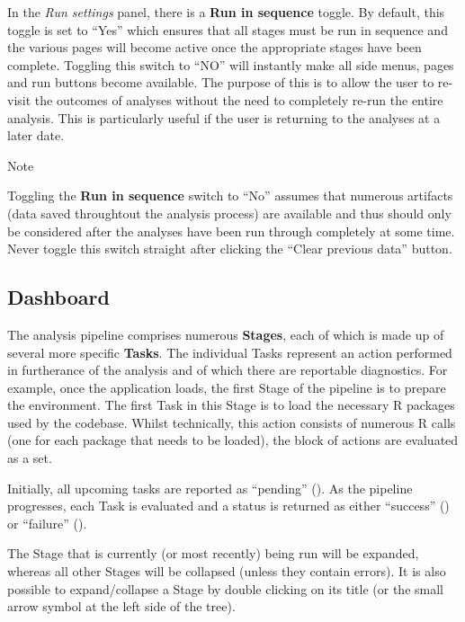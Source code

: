 \documentclass[
  8pt,
  a4paper]{article}
\begin{document}
In the \emph{Run settings} panel, there is a \textbf{Run in sequence}
toggle. By default, this toggle is set to ``Yes'' which ensures that all
stages must be run in sequence and the various pages will become active
once the appropriate stages have been complete. Toggling this switch to
``NO'' will instantly make all side menus, pages and run buttons become
available. The purpose of this is to allow the user to re-visit the
outcomes of analyses without the need to completely re-run the entire
analysis. This is particularly useful if the user is returning to the
analyses at a later date.

\begin{tcolorbox}[enhanced jigsaw, opacityback=0, breakable, arc=.35mm, toprule=.15mm, left=2mm, bottomrule=.15mm, rightrule=.15mm, colback=white, leftrule=.75mm, colframe=quarto-callout-color-frame]

Note

Toggling the \textbf{Run in sequence} switch to ``No'' assumes that
numerous artifacts (data saved throughtout the analysis process) are
available and thus should only be considered after the analyses have
been run through completely at some time. Never toggle this switch
straight after clicking the ``Clear previous data'' button.

\end{tcolorbox}

\subsection{Dashboard}\label{sec-dashboard}

The analysis pipeline comprises numerous \textbf{Stages}, each of which
is made up of several more specific \textbf{Tasks}. The individual Tasks
represent an action performed in furtherance of the analysis and of
which there are reportable diagnostics. For example, once the
application loads, the first Stage of the pipeline is to prepare the
environment. The first Task in this Stage is to load the necessary R
packages used by the codebase. Whilst technically, this action consists
of numerous R calls (one for each package that needs to be loaded), the
block of actions are evaluated as a set.

Initially, all upcoming tasks are reported as ``pending'' ({}). As the
pipeline progresses, each Task is evaluated and a status is returned as
either ``success'' ({}) or ``failure'' ({}).

The Stage that is currently (or most recently) being run will be
expanded, whereas all other Stages will be collapsed (unless they
contain errors). It is also possible to expand/collapse a Stage by
double clicking on its title (or the small arrow symbol at the left side
of the tree).
\end{document}
